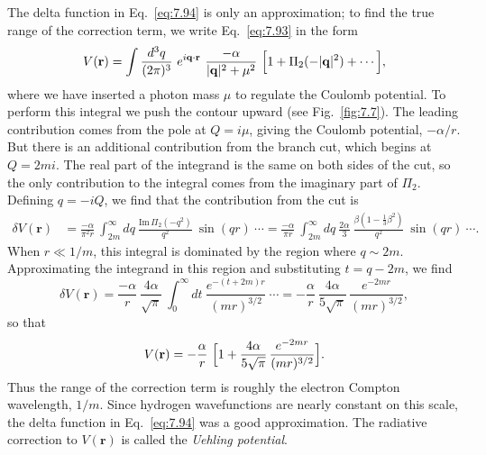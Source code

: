The delta function in Eq.~\eqref{eq:7.94} is only an approximation; to find
the true range of the correction term, we write Eq.~\eqref{eq:7.93} in the
form
\begin{equation}
  V(\mathbf{r}) = \int \frac{d^3q}{(2\pi)^3}\ e^{i\mathbf{q}\cdot\mathbf{r}}\
    \frac{-\alpha}{|\mathbf{q}|^2 + \mu^2}\ \Bigl[ 1 +
      \Pi_2(-|\mathbf{q}|^2) + \cdots \Bigr],
\end{equation}
where we have inserted a photon mass $\mu$ to regulate the Coulomb potential.
To perform this integral we push the contour upward (see
Fig.~\ref{fig:7.7}).  The leading contribution comes from the pole at
$Q = i\mu$, giving the Coulomb potential, $-\alpha/r$.  But there is an
additional contribution from the branch cut, which begins at
$Q = 2mi$.  The real part of the integrand is the same on both sides of the
cut, so the only contribution to the integral comes from the imaginary part
of $\Pi_2$.  Defining $q = -iQ$, we find that the contribution from the cut is
\begin{equation}
  \begin{aligned}
    \delta V(\mathbf{r}) &= \frac{-\alpha}{\pi^2 r}\ \int_{2m}^{\infty} dq\
      \frac{\mathrm{Im}\,\Pi_2(-q^2)}{q^2}\ \sin(qr)\ \cdots
    = \frac{-\alpha}{\pi r}\ \int_{2m}^{\infty} dq\
      \frac{2\alpha}{3}\ \frac{\beta(1-\tfrac{1}{3}\beta^2)}{q^2}\ \sin(qr)\ \cdots .
  \end{aligned}
\end{equation}
When $r \ll 1/m$, this integral is dominated by the region where
$q\sim 2m$.  Approximating the integrand in this region and substituting
$t = q - 2m$, we find
\begin{equation}
  \delta V(\mathbf{r}) = \frac{-\alpha}{r}\ \frac{4\alpha}{\sqrt{\pi}}\
    \int_0^{\infty} dt\ \frac{e^{-(t+2m)r}}{(mr)^{3/2}}\ \cdots
  = -\frac{\alpha}{r}\ \frac{4\alpha}{5\sqrt{\pi}}\,
    \frac{e^{-2mr}}{(mr)^{3/2}} ,
  \label{eq:7.95}
\end{equation}
so that
\begin{equation}
  V(\mathbf{r}) = -\frac{\alpha}{r}\ \Bigl[ 1 + \frac{4\alpha}{5\sqrt{\pi}}\,
    \frac{e^{-2mr}}{(mr)^{3/2}} \Bigr] .
  \label{eq:7.95b}
\end{equation}
Thus the range of the correction term is roughly the electron Compton
wavelength, $1/m$.  Since hydrogen wavefunctions are nearly constant on this
scale, the delta function in Eq.~\eqref{eq:7.94} was a good approximation.
The radiative correction to $V(\mathbf{r})$ is called the \emph{Uehling
potential}.


